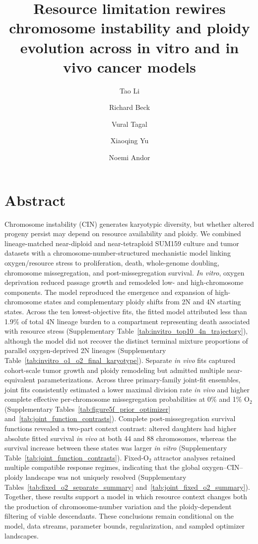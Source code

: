 \documentclass[11pt]{article}
\title{Resource limitation rewires chromosome instability and ploidy evolution across in vitro and in vivo cancer models}
\author[1,$\dagger$]{Tao Li}
\author[1,$\dagger$]{Richard Beck}
\author[1]{Vural Tagal}
\author[2]{Xiaoqing Yu}
\author[1,*]{Noemi Andor}
\affil[1]{H. Lee Moffitt Cancer Center \& Research Institute, Tampa, FL, USA}
\affil[2]{ \footnotesize Department of Biostatistics and Bioinformatics, H Lee Moffitt Cancer Center and Research Institute, Tampa, FL, USA}
\affil[$\dagger$]{These authors contributed equally to this work.}
\date{}
\begin{document}
\maketitle

\section*{Abstract}

Chromosome instability (CIN) generates karyotypic diversity, but whether altered progeny persist may depend on resource availability and ploidy. We combined lineage-matched near-diploid and near-tetraploid SUM159 culture and tumor datasets with a chromosome-number-structured mechanistic model linking oxygen/resource stress to proliferation, death, whole-genome doubling, chromosome missegregation, and post-missegregation survival. \textit{In vitro}, oxygen deprivation reduced passage growth and remodeled low- and high-chromosome components. The model reproduced the emergence and expansion of high-chromosome states and complementary ploidy shifts from 2N and 4N starting states. Across the ten lowest-objective fits, the fitted model attributed less than 1.9\% of total 4N lineage burden to a compartment representing death associated with resource stress (Supplementary Table~\ref{tab:invitro_top10_4n_trajectory}), although the model did not recover the distinct terminal mixture proportions of parallel oxygen-deprived 2N lineages (Supplementary Table~\ref{tab:invitro_o1_o2_final_karyotype}). Separate \textit{in vivo} fits captured cohort-scale tumor growth and ploidy remodeling but admitted multiple near-equivalent parameterizations. Across three primary-family joint-fit ensembles, joint fits consistently estimated a lower maximal division rate \textit{in vivo} and higher complete effective per-chromosome missegregation probabilities at 0\% and 1\% O$_2$ (Supplementary Tables~\ref{tab:figure5f_prior_optimizer} and~\ref{tab:joint_function_contrasts}). Complete post-missegregation survival functions revealed a two-part context contrast: altered daughters had higher absolute fitted survival \textit{in vivo} at both 44 and 88 chromosomes, whereas the survival increase between these states was larger \textit{in vitro} (Supplementary Table~\ref{tab:joint_function_contrasts}). Fixed-O$_2$ attractor analyses retained multiple compatible response regimes, indicating that the global oxygen--CIN--ploidy landscape was not uniquely resolved (Supplementary Tables~\ref{tab:fixed_o2_separate_summary} and~\ref{tab:joint_fixed_o2_summary}). Together, these results support a model in which resource context changes both the production of chromosome-number variation and the ploidy-dependent filtering of viable descendants. These conclusions remain conditional on the model, data streams, parameter bounds, regularization, and sampled optimizer landscapes.
\end{document}
